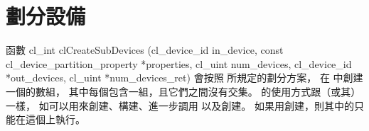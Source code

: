 \section{劃分設備}
函數
\startclc
cl_int clCreateSubDevices (cl_device_id in_device,
			   const cl_device_partition_property *properties,
			   cl_uint num_devices,
			   cl_device_id *out_devices,
			   cl_uint *num_devices_ret)
\stopclc
\noindenting 會按照  所規定的劃分方案，
在  中創建一個的數組，
其中每個包含一組，且它們之間沒有交集。
的使用方式跟（或其）一樣，
如可以用來創建、構建、進一步調用  以及創建。
如果用創建，則其中的只能在這個上執行。
